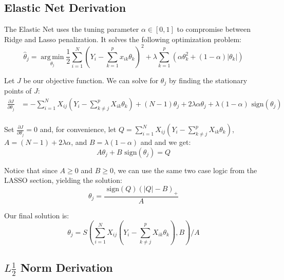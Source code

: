 \documentclass[11pt]{article}
\newcommand{\thh}{\hat{\theta}}
\newcommand{\sgn}{\text{ sign}}
\DeclareMathOperator*{\argmin}{arg\,min}
\begin{document}
\subsection{Elastic Net Derivation}
\label{enderiv}
The Elastic Net uses the tuning parameter $\alpha \in [0,1]$ to compromise between Ridge and Lasso penalization.  It solves the following optimization problem:
	$$\thh_j = \argmin\limits_{\theta_j} \frac{1}{2} \sum\limits_{i=1}^N \left(Y_i - \sum\limits_{k=1}^px_{ik}\theta_k \right)^2 + \lambda \sum\limits_{k=1}^p\left(\alpha\theta_k^2 + (1-\alpha)|\theta_k| \right)$$

Let $J$ be our objective function.  We can solve for $\theta_j$ by finding the stationary points of $J$:
\begin{equation}\begin{split}
	\frac{\partial J}{\partial \theta_j}
		& = -\sum\limits_{i=1}^N X_{ij}(Y_i - \sum\limits_{k \ne j}^p X_{ik}\theta_k) +(N-1)\theta_j + 2\lambda\alpha\theta_j + \lambda(1-\alpha)\sgn(\theta_j) \\
\end{split}\end{equation}

Set $\frac{\partial J}{\partial \theta_j}=0$ and, for convenience, let $Q = \sum\limits_{i=1}^N X_{ij}(Y_i - \sum\limits_{k \ne j}^p X_{ik}\theta_k)$, $A=(N-1)+2\lambda\alpha$, and $B=\lambda(1-\alpha)$ and and we get:
	$$A\theta_j + B\sgn(\theta_j) = Q$$

Notice that since $A \geq 0$ and $B \geq 0$, we can use the same two case logic from the LASSO section, yielding the solution:
	$$\theta_j = \frac{\sgn(Q)(|Q|-B)_+}{A}$$

Our final solution is:
	$$\theta_j = S\left(\sum\limits_{i=1}^N X_{ij}(Y_i - \sum\limits_{k \ne j}^p X_{ik}\theta_k), B\right)/A$$

\subsection{$L\frac{1}{2}$ Norm Derivation}
\end{document}

